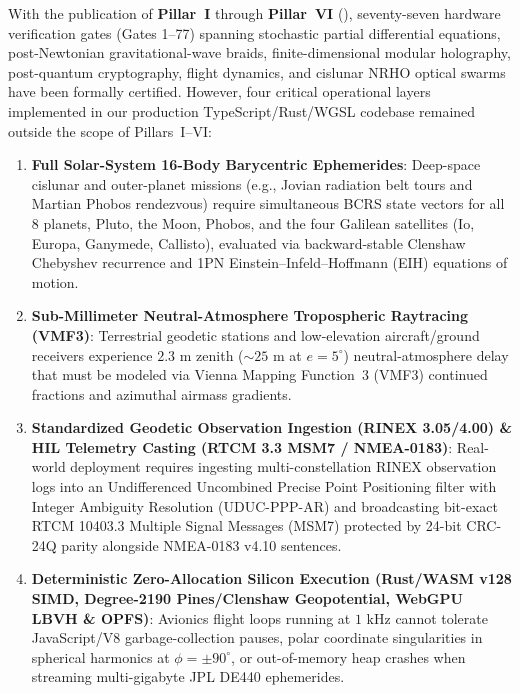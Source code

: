 \documentclass[11pt,a4paper,reqno]{article}
\def\texttt#1{#1}%
\theoremstyle{plain}
\theoremstyle{definition}
\theoremstyle{remark}
\numberwithin{equation}{section}
\begin{document}
With the publication of \textbf{Pillar~I} through \textbf{Pillar~VI} (\cite{UnmaniSPDE50,UnmaniAutomata90,UnmaniFiniteDim90,UnmaniTMD12,UnmaniPillarV2026,UnmaniPillarVI2026}), seventy-seven hardware verification gates (\texttt{Gates 1--77}) spanning stochastic partial differential equations, post-Newtonian gravitational-wave braids, finite-dimensional modular holography, post-quantum cryptography, flight dynamics, and cislunar NRHO optical swarms have been formally certified. However, four critical operational layers implemented in our production TypeScript/Rust/WGSL codebase remained outside the scope of Pillars~I--VI:
\begin{enumerate}[leftmargin=1.8em,itemsep=2pt]
  \item \textbf{Full Solar-System 16-Body Barycentric Ephemerides}: Deep-space cislunar and outer-planet missions (e.g., Jovian radiation belt tours and Martian Phobos rendezvous) require simultaneous BCRS state vectors for all 8 planets, Pluto, the Moon, Phobos, and the four Galilean satellites (Io, Europa, Ganymede, Callisto), evaluated via backward-stable Clenshaw Chebyshev recurrence and 1PN Einstein--Infeld--Hoffmann (EIH) equations of motion.
  \item \textbf{Sub-Millimeter Neutral-Atmosphere Tropospheric Raytracing (VMF3)}: Terrestrial geodetic stations and low-elevation aircraft/ground receivers experience $2.3\text{ m}$ zenith ($\sim 25\text{ m}$ at $e = 5^\circ$) neutral-atmosphere delay that must be modeled via Vienna Mapping Function~3 (VMF3) continued fractions and azimuthal airmass gradients.
  \item \textbf{Standardized Geodetic Observation Ingestion (RINEX 3.05/4.00) \& HIL Telemetry Casting (RTCM 3.3 MSM7 / NMEA-0183)}: Real-world deployment requires ingesting multi-constellation RINEX observation logs into an Undifferenced Uncombined Precise Point Positioning filter with Integer Ambiguity Resolution (UDUC-PPP-AR) and broadcasting bit-exact RTCM 10403.3 Multiple Signal Messages (MSM7) protected by 24-bit \texttt{CRC-24Q} parity alongside NMEA-0183 v4.10 sentences.
  \item \textbf{Deterministic Zero-Allocation Silicon Execution (Rust/WASM \texttt{v128} SIMD, Degree-2190 Pines/Clenshaw Geopotential, WebGPU LBVH \& OPFS)}: Avionics flight loops running at $1\text{ kHz}$ cannot tolerate JavaScript/V8 garbage-collection pauses, polar coordinate singularities in spherical harmonics at $\phi = \pm 90^\circ$, or out-of-memory heap crashes when streaming multi-gigabyte JPL DE440 ephemerides.
\end{enumerate}
\end{document}
